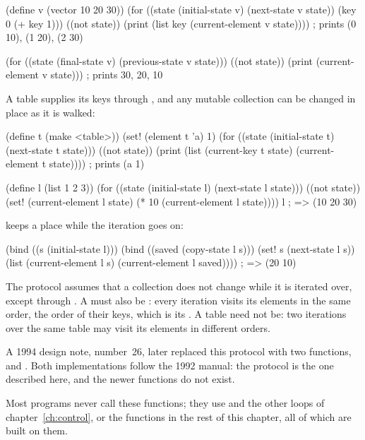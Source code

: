 \begin{dylan}
(define v (vector 10 20 30))
(for ((state (initial-state v) (next-state v state))
      (key 0 (+ key 1)))
     ((not state))
  (print (list key (current-element v state))))
; prints (0 10), (1 20), (2 30)

(for ((state (final-state v) (previous-state v state)))
     ((not state))
  (print (current-element v state)))
; prints 30, 20, 10
\end{dylan}

\noindent A table supplies its keys through , and any
mutable collection can be changed in place as it is walked:

\begin{dylan}
(define t (make <table>))
(set! (element t 'a) 1)
(for ((state (initial-state t) (next-state t state)))
     ((not state))
  (print (list (current-key t state) (current-element t state))))
; prints (a 1)

(define l (list 1 2 3))
(for ((state (initial-state l) (next-state l state)))
     ((not state))
  (set! (current-element l state) (* 10 (current-element l state))))
l    ; => (10 20 30)
\end{dylan}

\noindent {} keeps a place while the iteration goes on:

\begin{dylan}
(bind ((s (initial-state l)))
  (bind ((saved (copy-state l s)))
    (set! s (next-state l s))
    (list (current-element l s) (current-element l saved))))
; => (20 10)
\end{dylan}

\noindent The protocol assumes that a collection does not change while it
is iterated over, except through . A
 must also be : every iteration visits its
elements in the same order, the order of their keys, which is its
. A table need not be: two iterations over the same
table may visit its elements in different orders.

\begin{notebox}
A 1994 design note, number~26, later replaced this protocol with two
functions,  and
. Both implementations follow the 1992 manual: the protocol is the one
described here, and the newer functions do not exist.
\end{notebox}

Most programs never call these functions; they use  and
the other loops of chapter~\ref{ch:control}, or the functions in the
rest of this chapter, all of which are built on them.

